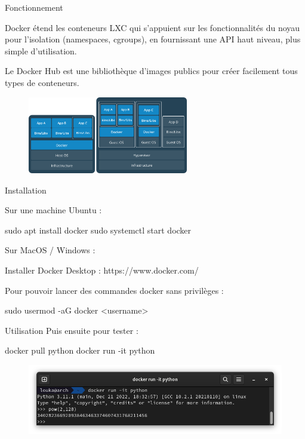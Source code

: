 \documentclass{cubeamer}
\begin{document}
\begin{frame}{Fonctionnement}
    \begin{multicols}{2}
    Docker étend les conteneurs LXC qui s'appuient sur les fonctionnalités du noyau pour
    l'isolation (namespaces, cgroups), en fournissant une API haut niveau, plus simple
    d'utilisation.

    Le Docker Hub est une bibliothèque d'images publics pour créer facilement tous
    types de conteneurs.
    
    \columnbreak
    \begin{figure}
        \centering
        \includegraphics[width=7cm]{img/vm-container}
    \end{figure}    

    \end{multicols}
\end{frame}

\begin{frame}[fragile]{Installation}
    \begin{multicols}{2}
Sur une machine Ubuntu :
\begin{bashResized}{0.48}
sudo apt install docker
sudo systemctl start docker
\end{bashResized}
    \columnbreak
    
Sur MacOS / Windows :
\begin{bashResized}{0.48}
Installer Docker Desktop :
https://www.docker.com/
\end{bashResized}
    \end{multicols}

    Pour pouvoir lancer des commandes docker sans privilèges :
\begin{bash}
sudo usermod -aG docker <username>
\end{bash}
\end{frame}

\begin{frame}[fragile]{Utilisation}
    Puis ensuite pour tester :
\begin{bash}
docker pull python
docker run -it python
\end{bash}

    \begin{figure}
        \centering
        \includegraphics[width=\textwidth]{img/docker-test.png}
    \end{figure}
\end{frame}
\end{document}
